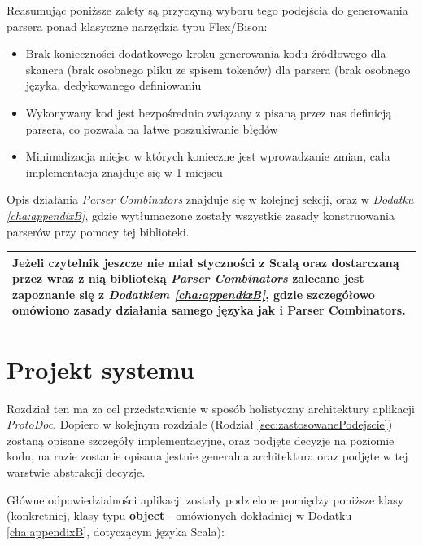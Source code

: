 \documentclass[pdflatex,11pt]{aghdpl}
\begin{document}
Reasumując poniższe zalety są przyczyną wyboru tego podejścia do generowania parsera ponad klasyczne narzędzia typu Flex/Bison:
\begin{itemize}
 \item Brak konieczności dodatkowego kroku generowania kodu źródłowego
  \subitem dla skanera (brak osobnego pliku ze spisem tokenów)
  \subitem dla parsera (brak osobnego języka, dedykowanego definiowaniu
 \item Wykonywany kod jest bezpośrednio związany z pisaną przez nas definicją parsera, co pozwala na łatwe poszukiwanie błędów
 \item Minimalizacja miejsc w których konieczne jest wprowadzanie zmian, cała implementacja znajduje się w 1 miejscu
\end{itemize}

Opis działania \textit{Parser Combinators} znajduje się w kolejnej sekcji, oraz w \textit{Dodatku \ref{cha:appendixB}}, gdzie wytłumaczone zostały wszystkie zasady
konstruowania parserów przy pomocy tej biblioteki.

\begin{center}
\begin{tabular}{ | p{\textwidth} | }
  \hline 
  Jeżeli czytelnik jeszcze nie miał styczności z Scalą oraz dostarczaną przez wraz z nią biblioteką 
  \textit{Parser Combinators} zalecane jest zapoznanie się z \textit{Dodatkiem \ref{cha:appendixB}}, 
  gdzie szczegółowo omówiono zasady działania samego języka jak i Parser Combinators. \\
  \hline 
\end{tabular}
\end{center}

\chapter{Projekt systemu}
\label{cha:projekt_systemu}

Rozdział ten ma za cel przedstawienie w sposób holistyczny architektury aplikacji \textit{ProtoDoc}.
Dopiero w kolejnym rozdziale (Rodział \ref{sec:zastosowanePodejscie}) zostaną opisane szczegóły implementacyjne, oraz podjęte decyzje na poziomie kodu,
na razie zostanie opisana jestnie generalna architektura oraz podjęte w tej warstwie abstrakcji decyzje.

Główne odpowiedzialności aplikacji zostały podzielone pomiędzy
poniższe klasy (konkretniej, klasy typu \textbf{object} - omówionych dokładniej w Dodatku \ref{cha:appendixB}, dotyczącym języka Scala):
\end{document}
